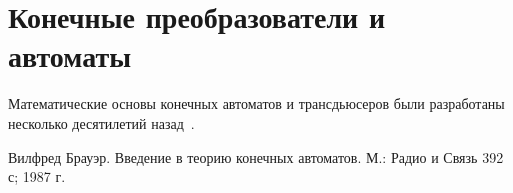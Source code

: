 \section{Конечные преобразователи и автоматы} \label{sect_review_automaton}

Математические основы конечных автоматов и трансдьюсеров были разработаны 
несколько десятилетий назад~\cite{MohriChapter4Lothaire2005applied}.


Вилфред Брауэр. Введение в теорию конечных автоматов. М.: Радио и Связь 392 с; 
1987 г. 










